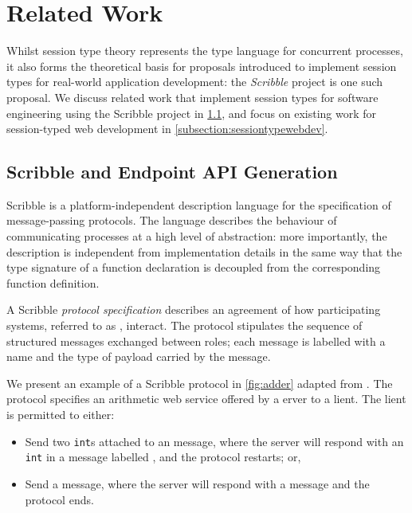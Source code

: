 \section{Related Work}
\label{section:bgrelated}

Whilst session type theory represents 
the type language for concurrent processes,
it also forms the theoretical basis for proposals
introduced to implement session types for 
real-world application development:
the \textit{Scribble} project is one such proposal.
We discuss related work that 
implement session types for software
engineering using the Scribble project
in \cref{subsection:bgscribble},
and focus on existing work for
session-typed web development
in \cref{subsection:sessiontypewebdev}.

\subsection{Scribble and Endpoint API Generation}
\label{subsection:bgscribble}

Scribble \cite{Scribble} is a
platform-independent description language 
for the specification of message-passing protocols.
The language describes the behaviour of 
communicating processes at a high level of abstraction:
more importantly, the description is independent from 
implementation details in the same way that 
the type signature of a function declaration is decoupled 
from the corresponding function definition.

A Scribble \textit{protocol specification} 
describes an agreement of how participating systems, 
referred to as , interact. 
The protocol stipulates the sequence of structured messages 
exchanged between roles; 
each message is labelled with a name and the
type of payload carried by the message.

We present an example of a Scribble protocol in 
\cref{fig:adder} adapted from \cite{Hybrid2016}.
The protocol specifies an arithmetic web service 
offered by a erver to a lient.
The lient is permitted to either:

\begin{itemize}
\item 
Send two \texttt{int}s attached to an  message, 
where the server will respond with an \texttt{int} in a 
message labelled , and the protocol restarts; or,
\item
Send a  message, where the server will 
respond with a  message and the protocol ends.
\end{itemize}

